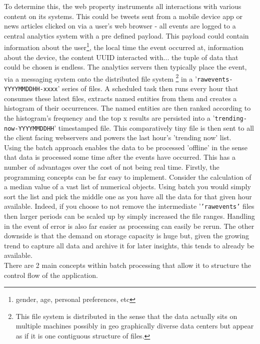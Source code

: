 \documentclass[a4paper,11pt]{scrreprt}
\begin{document}
To determine this, the web property instruments all interactions with various content on its systems. This could be tweets sent from a mobile device app or news articles clicked on via a user's web browser - all events are logged to a central analytics system with a pre defined payload. This payload could contain information about the user\footnote{gender, age, personal preferences, etc}, the local time the event occurred at, information about the device, the content UUID interacted with... the tuple of data that could be chosen is endless. The analytics servers then typically place the event, via a messaging system onto the distributed file system \footnote{This file system is distributed in the sense that the data actually sits on multiple machines possibly  in geo graphically diverse data centers but appear as if it is one contiguous structure of files.} in a '\texttt{rawevents-YYYYMMDDHH-xxxx}' series of files. A scheduled task then runs every hour that consumes these latest files, extracts named entities from them and creates a histogram of their occurrences. The named entities are then ranked according to the histogram's frequency and the top x results are persisted into a '\texttt{trending-now-YYYYMMDDHH}' timestamped file. This comparatively tiny file is then sent to all the client facing webservers and powers the last hour's 'trending now' list.\\

Using the batch approach enables the data to be processed 'offline' in the sense that data is processed some time after the events have occurred.  This has a number of advantages over the cost of not being real time. Firstly, the programming concepts can be far easy to implement. Consider the calculation of a median value of a vast list of numerical objects. Using batch you would simply sort the list and pick the middle one as you have all the data for that given hour available. Indeed, if you choose to not remove the intermediate '\texttt{'rawevents'} files then larger periods can be scaled up by simply increased the file ranges. Handling in the event of error is also far easier as processing can easily be rerun. The other downside is that the demand on storage capacity is huge but, given the growing trend to capture all data and archive it for later insights, this tends to already be available.\\

There are 2 main concepts within batch processing that allow it to structure the control flow of the application.
\end{document}
